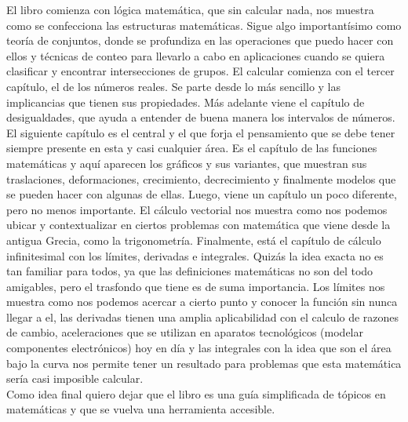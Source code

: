 El libro comienza con lógica matemática, que sin calcular nada, nos muestra como se confecciona las estructuras matemáticas. Sigue algo importantísimo como teoría de conjuntos, donde se profundiza en las operaciones que puedo hacer con ellos y técnicas de conteo para llevarlo a cabo en aplicaciones cuando se quiera clasificar y encontrar intersecciones de grupos. El calcular comienza con el tercer capítulo, el de los números reales. Se parte desde lo más sencillo y las implicancias que tienen sus propiedades. Más adelante viene el capítulo de desigualdades, que ayuda a entender de buena manera los intervalos de números. El siguiente capítulo es el central y el que forja el pensamiento que se debe tener siempre presente en esta y casi cualquier área. Es el capítulo de las funciones matemáticas y aquí aparecen los gráficos y sus variantes, que muestran sus traslaciones, deformaciones, crecimiento, decrecimiento y finalmente modelos que se pueden hacer con algunas de ellas. Luego, viene un capítulo un poco diferente, pero no menos importante. El cálculo vectorial nos muestra como nos podemos ubicar y contextualizar en ciertos problemas con matemática que viene desde la antigua Grecia, como la trigonometría. Finalmente, está el capítulo de cálculo infinitesimal con los límites, derivadas e integrales. Quizás la idea exacta no es tan familiar para todos, ya que las definiciones matemáticas no son del todo amigables, pero el trasfondo que tiene es de suma importancia. Los límites nos muestra como nos podemos acercar a cierto punto y conocer la función sin nunca llegar a el, las derivadas tienen una amplia aplicabilidad con el calculo de razones de cambio, aceleraciones que se utilizan en aparatos tecnológicos (modelar componentes electrónicos) hoy en día y las integrales con la idea que son el área bajo la curva nos permite tener un resultado para problemas que esta matemática sería casi imposible calcular.\\

Como idea final quiero dejar que el libro es una guía simplificada de tópicos en matemáticas y que se vuelva una herramienta accesible.

\cleardoublepage
